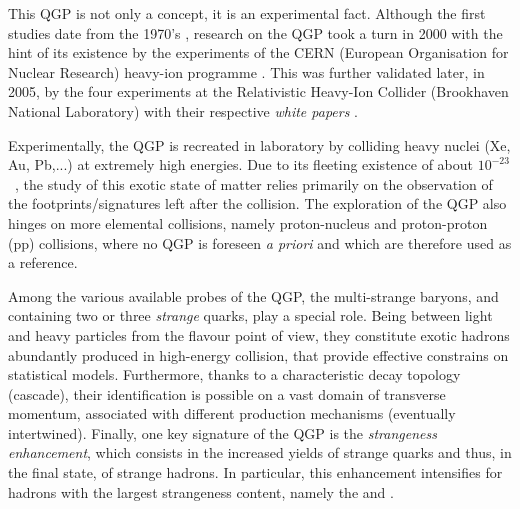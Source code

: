 This QGP is not only a concept, it is an experimental fact. Although the first studies date from the 1970's \cite{carruthersQuarkiumBizarreFermi1974}\cite{harringtonHighDensityPhaseTransitions1974}\cite{collinsSuperdenseMatterNeutrons1975}, research on the QGP took a turn in 2000 with the hint of its existence by the experiments of the CERN (European Organisation for Nuclear Research) heavy-ion programme \cite{NewStateMatter2023}. This was further validated later, in 2005, by the four experiments at the Relativistic Heavy-Ion Collider (Brookhaven National Laboratory) with their respective \emph{white papers} \cite{ludlamHUNTINGQUARKGLUON2005}\cite{arseneQuarkGluonPlasma2005}\cite{alPHOBOSPerspectiveDiscoveries2005}\cite{phenixcollaborationFormationDensePartonic2005}\cite{starcollaborationExperimentalTheoreticalChallenges2005}.

Experimentally, the QGP is recreated in laboratory by colliding heavy nuclei (Xe, Au, Pb,...) at extremely high energies. Due to its fleeting existence of about $10^{-23}$~\second, the study of this exotic state of matter relies primarily on the observation of the footprints/signatures left after the collision. The exploration of the QGP also hinges on more elemental collisions, namely proton-nucleus and proton-proton (pp) collisions, where no QGP is foreseen \emph{a priori} and which are therefore used as a reference.

Among the various available probes of the QGP, the multi-strange baryons, \rmXi and \rmOmega containing two or three \textit{strange} quarks, play a special role. Being between light and heavy particles from the flavour point of view, they constitute exotic hadrons abundantly produced in high-energy collision, that provide effective constrains on statistical models. Furthermore, thanks to a characteristic decay topology (cascade), their identification is possible on a vast domain of transverse momentum, associated with different production mechanisms (eventually intertwined). Finally, one key signature of the QGP is the \textit{strangeness enhancement}, which consists in the increased yields of strange quarks and thus, in the final state, of strange hadrons. In particular, this enhancement intensifies for hadrons with the largest strangeness content, namely the \rmXi and \rmOmega.\\

